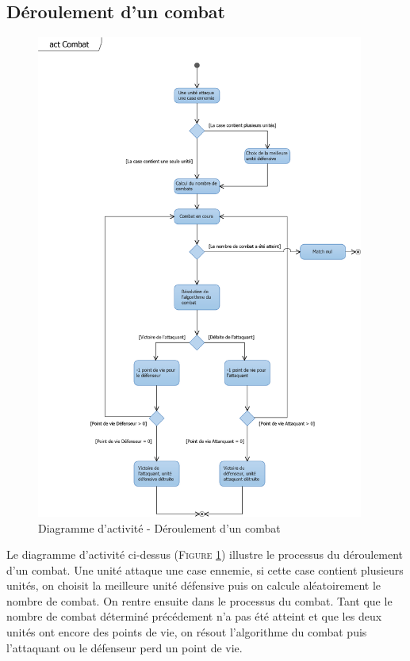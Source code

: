 \documentclass[a4paper,11pt]{article}
\begin{document}
	\subsection{Déroulement d'un combat}
		\begin{figure}[ht!]
			\includegraphics[height=16cm]{actCombat.png}
			\caption{Diagramme d'activité - Déroulement d'un combat}
			\label{fig:actcombat}
		\end{figure}
		\vspace*{1cm}
		Le diagramme d'activité ci-dessus (\textsc{Figure \ref{fig:actcombat}}) illustre le processus du déroulement d'un combat. Une unité attaque une case ennemie, si cette case contient plusieurs unités, on choisit la meilleure unité défensive puis on calcule aléatoirement le nombre de combat. On rentre ensuite dans le processus du combat. Tant que le nombre de combat déterminé précédement n'a pas été atteint et que les deux unités ont encore des points de vie, on résout l'algorithme du combat puis l'attaquant ou le défenseur perd un point de vie.
		\newpage
\end{document}
